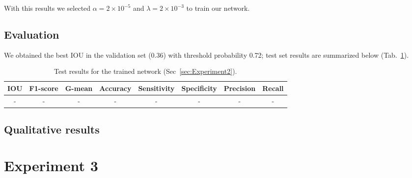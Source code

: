 With this results we selected $\alpha = 2 \times 10^{-5}$ and $\lambda = 2 \times 10^{-3}$ to train our network.

\subsection{Evaluation}
We obtained the best IOU in the validation set (0.36) with threshold probability 0.72; test set results are summarized below (Tab.~\ref{tab:Results2}).
\begin{table}[h]
	\centering
	\begin{tabular}{cccccccc}
	\hline
	\textbf{IOU}	& \textbf{F1-score}	& \textbf{G-mean} &\textbf{Accuracy}	& \textbf{Sensitivity} & \textbf{Specificity} & \textbf{Precision} & \textbf{Recall}\\
	\hline
	 - & - & - & - & - & - & - & -\\
	\hline
	\end{tabular}
	\caption[Results for Experiment 2]{Test results for the trained network (Sec~\ref{sec:Experiment2}).}
	\label{tab:Results2}
\end{table}

\subsection{Qualitative results}



\section{Experiment 3}
